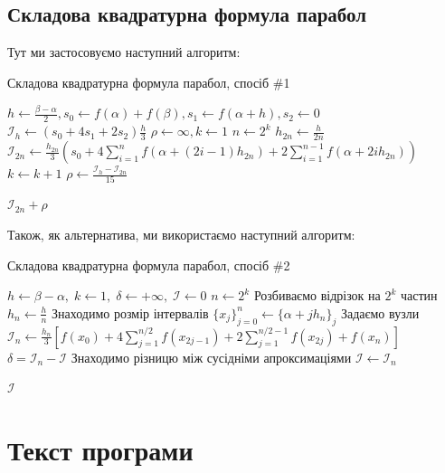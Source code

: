 \documentclass[12pt]{extarticle}
\begin{document}
\subsection{Складова квадратурна формула парабол}\label{section:simpson_formula}
Тут ми застосовуємо наступний алгоритм:
\begin{algorithm}[H]
\caption{Складова квадратурна формула парабол, спосіб \#1}\label{alg:cap}
\begin{algorithmic}
\State $h \gets \frac{\beta-\alpha}{2}, s_0 \gets f(\alpha)+f(\beta), s_1 \gets f(\alpha+h), s_2 \gets 0$
\State $\mathcal{I}_h \gets (s_0+4s_1+2s_2)\frac{h}{3}$
\State $\rho \gets \infty, k \gets 1$
\For{$\left|\rho\right| > \varepsilon$}
    \State $n \gets 2^k$
    \State $h_{2n} \gets \frac{h}{2n}$
    \State $\mathcal{I}_{2n} \gets \frac{h_{2n}}{3}\left(s_0+4\sum_{i=1}^n f\left(\alpha+(2i-1)h_{2n}\right) + 2\sum_{i=1}^{n-1}f\left(\alpha+2ih_{2n}\right)\right)$
    \State $k \gets k+1$
    \State $\rho \gets \frac{\mathcal{I}_h-\mathcal{I}_{2n}}{15}$
\EndFor

\Return $\mathcal{I}_{2n} + \rho$
\end{algorithmic}
\end{algorithm}

Також, як альтернатива, ми використаємо наступний алгоритм:

\begin{algorithm}[H]
\caption{Складова квадратурна формула парабол, спосіб \#2}\label{alg:cap}
\begin{algorithmic}
\State $h \gets \beta - \alpha,\; k \gets 1,\; \delta \gets +\infty,\; \mathcal{I} \gets 0$
\For{$|\delta| > \varepsilon$}
    \State $n \gets 2^k$ 
    \Comment Розбиваємо відрізок на $2^k$ частин
    \State $h_n \gets \frac{h}{n}$
    \Comment Знаходимо розмір інтервалів
    \State $\{x_j\}_{j=0}^n \gets \{\alpha + jh_n\}_{j}$
    \Comment Задаємо вузли
    \State $\mathcal{I}_n \gets \frac{h_n}{3}\left[f(x_0)+4\sum_{j=1}^{n/2}f(x_{2j-1}) + 2\sum_{j=1}^{n/2-1}f(x_{2j})+f(x_n)\right]$
    \State $\delta = \mathcal{I}_n - \mathcal{I}$
    \Comment Знаходимо різницю між сусідніми апроксимаціями
    \State $\mathcal{I} \gets \mathcal{I}_n$
\EndFor

\Return $\mathcal{I}$
\end{algorithmic}
\end{algorithm}

\pagebreak
\section{Текст програми}
\end{document}
